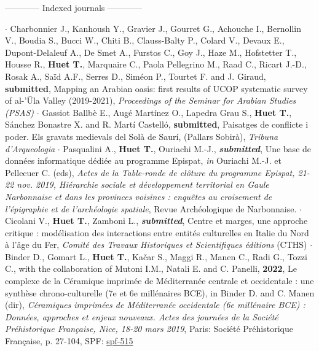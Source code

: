 \documentclass{article}
\begin{document}
\begin{center}------------ Indexed journals ------------\end{center}
$\cdot$ Charbonnier J., Kanhoush Y., Gravier J., Gourret G., Achouche I., Bernollin V., Boudia S., Bucci W., Chiti B., Clauss-Balty P., Colard V., Devaux E., Dupont-Delaleuf A., De Smet A., Furstos C., Goy J., Haze M., Hofstetter T., Housse R., \textbf{Huet T.}, Marquaire C., Paola Pellegrino M., Raad C., Ricart J.-D., Rosak A., Saïd A.F., Serres D., Siméon P., Tourtet F. and J. Giraud, \textbf{submitted}, Mapping an Arabian oasis: first results of UCOP systematic survey of al-'Ūla Valley
(2019-2021), \textit{Proceedings of the Seminar for Arabian Studies (PSAS)}
$\cdot$ Gassiot Ballbè E., Augé Martínez O., Lapedra Grau S., \textbf{Huet T.}, Sánchez Bonastre X. and R. Martí Castelló, \textbf{submitted}, Paisatges de conflicte i poder. Els gravats medievals del Solà de Saurí, (Pallars Sobirà), \textit{Tribuna d'Arqueologia}
\smallbreak
$\cdot$ Pasqualini A., \textbf{Huet T.}, Ouriachi M.-J., \textit{\textbf{submitted}}, Une base de données informatique dédiée au programme Epispat, \textit{in} Ouriachi M.-J. et Pellecuer C. (eds), \textit{Actes de la Table-ronde de cl\^{o}ture du programme Epispat, 21-22 nov. 2019, Hi\'{e}rarchie sociale et d\'{e}veloppement territorial en Gaule Narbonnaise et dans les provinces voisines : enqu\^{e}tes au croisement de l'\'{e}pigraphie et de l'arch\'{e}ologie spatiale}, Revue Arch\'{e}ologique de Narbonnaise.
\smallbreak
$\cdot$ Cicolani V., \textbf{Huet T.}, Zamboni L., \textit{\textbf{submitted}}, Centre et marges, une approche critique : modélisation des interactions entre entités culturelles en Italie du Nord à l'âge du Fer, \textit{Comit\'{e} des Travaux Historiques et Scientifiques \'{e}ditions} (CTHS)
\smallbreak
$\cdot$ Binder D., Gomart L., \textbf{Huet T.}, Ka{\v{c}}ar S., Maggi R., Manen C., Radi G., Tozzi C., with the collaboration of Mutoni I.M., Natali E. and C. Panelli, \textbf{2022}, Le complexe de la C\'{e}ramique imprim\'{e}e de M\'{e}diterran\'{e}e centrale et occidentale : une synthèse chrono-culturelle (7e et 6e millénaires BCE), in Binder D. and C. Manen (dir), \textit{C\'{e}ramiques imprim\'{e}es de M\'{e}diterran\'{e}e occidentale (6e mill\'{e}naire BCE) : Donn\'{e}es, approches et enjeux nouveaux. Actes des journ\'{e}es de la Soci\'{e}t\'{e} Pr\'{e}historique Fran\c{c}aise, Nice, 18-20 mars 2019}, Paris: Soci\'{e}t\'{e} Pr\'{e}historique Fran\c{c}aise, p. 27-104, SPF: \href{https://www.prehistoire.org/offres/doc_inline_src/515/SPF_CIMO_27-124_binder-gomart-et-al.pdf}{spf-515}
\end{document}
